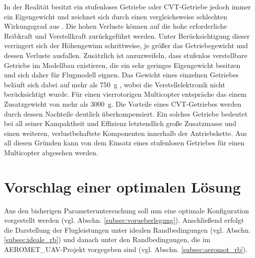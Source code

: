 In der Realität besitzt ein stufenloses Getriebe oder CVT-Getriebe jedoch immer ein Eigengewicht und zeichnet sich durch einen vergleichsweise schlechten Wirkungsgrad aus \cite[S.295-S.297]{Fischer.2016}. %
Die hohen Verluste können auf die hohe erforderliche Reibkraft und Verstellkraft zurückgeführt werden. Unter Berücksichtigung dieser verringert sich der Höhengewinn schrittweise, je größer das Getriebegewicht und dessen Verluste ausfallen. 
Zusätzlich ist anzuzweifeln, dass stufenlos verstellbare Getriebe im Modellbau existieren, die ein sehr geringes Eigengewicht besitzen und sich daher für Flugmodell eignen.
Das Gewicht eines einzelnen Getriebes beläuft sich dabei auf mehr als \SI{750}{g} \cite{cvt}, wobei die Verstellelektronik nicht berücksichtigt wurde. Für einen vierrotorigen Multicopter entspräche das einem Zusatzgewicht von mehr als \SI{3000}{g}. 
Die Vorteile eines CVT-Getriebes werden durch dessen Nachteile deutlich überkompensiert. Ein solches Getriebe bedeutet bei all seiner Kampaktheit und Effizienz letztendlich große Zusatzmasse und einen weiteren, verlustbehaftete Komponenten innerhalb der Antriebskette. Aus all diesen Gründen kann von dem Einsatz eines stufenlosen Getriebes für einen Multicopter abgesehen werden.


\section{Vorschlag einer optimalen Lösung}
\label{sec:otimale_lsg}
Aus den bisherigen Parameteruntersuchung soll nun eine optimale Konfiguration vorgestellt werden (vgl. Abschn. \ref{subsec:vorueberlegung}). Anschließend erfolgt die Darstellung der Flugleistungen unter idealen Randbedingungen (vgl. Abschn. \ref{subsec:ideale_rb}) und danach unter den Randbedingungen, die im AEROMET\_UAV-Projekt vorgegeben sind (vgl. Abschn. \ref{subsec:aeromot_rb}). 


